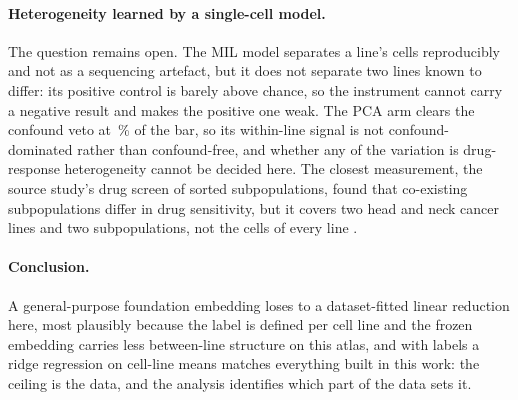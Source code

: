 \paragraph{Heterogeneity learned by a single-cell model.} The question remains open. The MIL model
separates a line's cells reproducibly and not as a sequencing artefact, but it does not separate two
lines known to differ: its positive control is barely above chance, so the instrument cannot carry a
negative result and makes the positive one weak. The PCA arm clears the
confound veto at \QBarPca\,\% of the bar, so its within-line signal is not confound-dominated rather than
confound-free, and whether any of the variation is drug-response heterogeneity cannot be decided here. The closest
measurement, the source study's drug screen of sorted subpopulations, found that co-existing
subpopulations differ in drug sensitivity, but it covers two head and neck cancer lines and two
subpopulations, not the cells of every line \cite{scp542}.

\paragraph{Conclusion.} A general-purpose foundation embedding loses to a dataset-fitted linear reduction
here, most plausibly because the label is defined per cell line and the frozen embedding carries less
between-line structure on this atlas, and with
\NLinesCV{} labels a ridge regression on cell-line means matches everything built in this work: the
ceiling is the data, and the analysis identifies which part of the data sets it.
